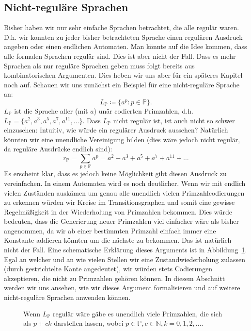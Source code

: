 \documentclass[11pt, a4paper]{article}
\theoremstyle{definition}
\theoremstyle{plain}
\numberwithin{equation}{section}
\begin{document}
\subsection{Nicht-reguläre Sprachen}\label{sec:regular_nonregular}
Bisher haben wir nur sehr einfache Sprachen betrachtet, die alle regulär waren. D.h. wir konnten zu jeder bisher betrachteten Sprache einen regulären Ausdruck angeben oder einen endlichen Automaten. Man könnte auf die Idee kommen, dass alle formalen Sprachen regulär sind. Dies ist aber nicht der Fall. Dass es mehr Sprachen als nur reguläre Sprachen geben muss folgt bereits aus kombinatorischen Argumenten. Dies heben wir uns aber für ein späteres Kapitel noch auf. Schauen wir uns zunächst ein Beispiel für eine nicht-reguläre Sprache an:
$$
	L_\mathbb{P} \coloneqq \{ a^p : p \in \mathbb{P} \}.
$$
$L_\mathbb{P}$ ist die Sprache aller (mit $a$) unär codierten Primzahlen, d.h. $L_\mathbb{P} = \{ a^2, a^3, a^5, a^7, a^{11}, \ldots \}$. Dass $L_\mathbb{P}$ nicht regulär ist, ist auch nicht so schwer einzusehen: Intuitiv, wie würde ein regulärer Ausdruck aussehen? Natürlich könnten wir eine unendliche Vereinigung bilden (dies wäre jedoch nicht regulär, da reguläre Ausdrücke endlich sind):
$$
	r_\mathbb{P} = \sum_{p \in \mathbb{P}} a^p = a^2 + a^3 + a^5 + a^7 + a^{11} + \ldots
$$
Es erscheint klar, dass es jedoch keine Möglichkeit gibt diesen Ausdruck zu vereinfachen. In einem Automaten wird es noch deutlicher. Wenn wir mit endlich vielen Zuständen auskämen um genau alle unendlich vielen Primzahlcodierungen zu erkennen würden wir Kreise im Transitionsgraphen und somit eine gewisse Regelmäßigkeit in der Wiederholung von Primzahlen bekommen. Dies würde bedeuten, dass die Generierung neuer Primzahlen viel einfacher wäre als bisher angenommen, da wir ab einer bestimmten Primzahl einfach immer eine Konstante addieren könnten um die nächste zu bekommen. Das ist natürlich nicht der Fall. Eine schematische Erklärung dieses Arguments ist in Abbildung~\ref{fig:dfa_primes}. Egal an welcher und an wie vielen Stellen wir eine Zustandwiederholung zulassen (durch gestrichtelte Kante angedeutet), wir würden stets Codierungen akzeptieren, die nicht zu Primzahlen gehören können. In diesem Abschnitt werden wir uns ansehen, wie wir dieses Argument formalisieren und auf weitere nicht-reguläre Sprachen anwenden können.
\begin{figure}
	\centering
	
	\caption{Wenn $L_\mathbb{P}$ regulär wäre gäbe es unendlich viele Primzahlen, die sich als $p + ck$ darstellen lassen, wobei $p \in \mathbb{P}, c \in \mathbb{N}, k = 0, 1, 2, \ldots$.}
	\label{fig:dfa_primes}
\end{figure}
\end{document}
